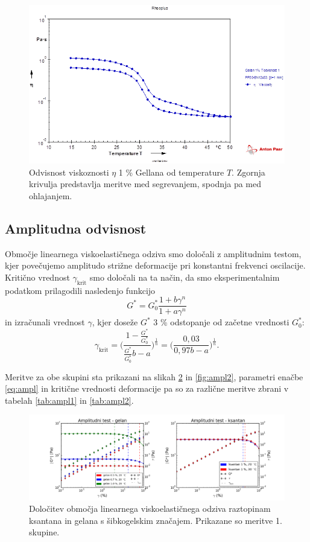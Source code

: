\documentclass{article}
\begin{document}
\begin{figure}
  \centering
  \includegraphics[width=\linewidth]{T_odv.png}
  \caption{Odvisnost viskoznosti $\eta$ 1 \% Gellana od temperature $T$. Zgornja krivulja predstavlja meritve med segrevanjem, spodnja pa med ohlajanjem.}
  \label{fig:temp}
\end{figure}


\subsection{Amplitudna odvisnost}

Območje linearnega viskoelastičnega odziva smo določali z amplitudnim testom, kjer povečujemo amplitudo strižne deformacije pri konstantni frekvenci oscilacije. Kritično vrednost $\gamma_\mathrm{krit}$ smo določali na ta način, da smo eksperimentalnim podatkom prilagodili nasledenjo funkcijo
\begin{equation} \label{eq:ampl}
G^* = G^*_0\frac{1+b\gamma^n}{1+a\gamma^n}
\end{equation}
in izračunali vrednost $\gamma$, kjer doseže $G^*$ 3 \% odstopanje od začetne vrednosti $G^*_0$:
\begin{equation}
\gamma_\mathrm{krit}=\Bigg( \frac{1-\frac{G^*}{G^*_0}}{\frac{G^*}{G^*_0}b-a} \Bigg)^{\frac{1}{n}} = \Bigg( \frac{0,03}{0,97b-a} \Bigg)^{\frac{1}{n}} .
\end{equation}

Meritve za obe skupini sta prikazani na slikah \ref{fig:ampl1} in \ref{fig:ampl2}, parametri enačbe \ref{eq:ampl} in kritične vrednosti deformacije pa so za različne meritve zbrani v tabelah \ref{tab:ampl1} in \ref{tab:ampl2}.

\begin{figure}
  \centering
  \includegraphics[width=\linewidth]{S1ampl.png}
  \caption{Določitev območja linearnega viskoelastičnega odziva raztopinam ksantana in gelana s šibkogelskim značajem. Prikazane so meritve 1. skupine.}
  \label{fig:ampl1}
\end{figure}
\end{document}
